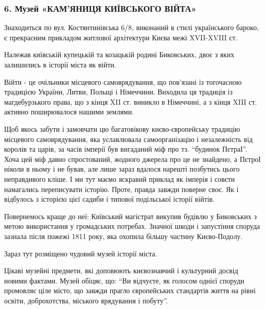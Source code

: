  
 
 
 
 
\subsubsection{6. Музей «КАМ’ЯНИЦЯ КИЇВСЬКОГО ВІЙТА»}

Знаходиться по вул. Костянтинівська 6/8, виконаний в стилі українського бароко,
є прекрасним прикладом житлової архітектури Києва межі XVII-XVIII ст.

Належав київській купецькій та козацькій родині Биковських, двоє з яких
залишились в історії міста як війти. 

Війти - це очільники місцевого самоврядування, що пов’язані із тогочасною
традицією України, Литви, Польщі і Німеччини. Виходила ця традиція із
магдебурзького права, що з кінця XII ст. виникло в Німеччині, а з кінця XIII
ст. активно поширювалося нашими землями.

Щоб якось забути і замовчати цю багатовікову києво-європейську традицію
місцевого самоврядування, яка уславлювала самоорганізацію і незалежність від
королів та царів, за часів імперії був вигаданий міф про тз. “будинок ПєтраІ”.
Хоча цей міф давно спростований, жодного джерела про це не знайдено, а ПєтроІ
ніколи в ньому і не бував, але лише зараз вдалося нарешті позбутись цього
неправдивого кліше. І ми тут маємо яскравий приклад як імперія і совєти
намагались переписувати історію. Проте, правда завжди поверне своє. Як і
відбулось з історією цієї садиби і типової подільської історії війтів. 

Повернемось краще до неї: Київський магістрат викупив будівлю у Биковських з
метою використання у громадських потребах. Значної шкоди і запустіння споруда
зазнала після пожежі 1811 року, яка охопила більшу частину Києво-Подолу.  

Зараз тут розміщено чудовий музей історії міста. 

Цікаві музейні предмети, які доповюють києвознавчий і культурний досвід новими
фактами. Музей обіцяє, що: \enquote{Ви відчуєте, як голосом однієї споруди промовляє
ціле місто, що завжди прагло європейських стандартів життя на рівні освіти,
доброхотства, міського врядування і побуту}. 

